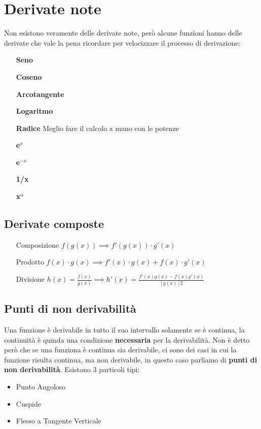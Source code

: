 \section{Derivate note}
Non esistono veramente delle derivate note, però alcune funzioni hanno delle derivate che vale la pena ricordare per velocizzare il processo di derivazione:
\begin{itemize}
	\item[\textbf{Seno}] 
	\item[\textbf{Coseno}] 
	\item[\textbf{Arcotangente}] 
	\item[\textbf{Logaritmo}] 
	\item[\textbf{Radice}] Meglio fare il calcolo a mano con le potenze%
	\item[\textbf{e$^x$}] 
	\item[\textbf{e$^{-x}$}] 
	\item[\textbf{1/x}] 
	\item[\textbf{x$^\alpha$}] 
\end{itemize}
\subsection*{Derivate composte}
\begin{itemize}
	\item[Composizione] $f(g(x)) \implies f'(g(x)) \cdot g'(x)$
	\item[Prodotto] $f(x) \cdot g(x) \implies f'(x) \cdot g(x) + f(x) \cdot g'(x)$
	\item[Divisione] $h(x)=\frac{f(x)}{g(x)} \implies h'(x) = \frac{f'(x)g(x) - f(x)g'(x)}{[g(x)]2}$
\end{itemize}
\subsection*{Punti di non derivabilità}
Una funzione è derivabile in tutto il suo intervallo solamente se è continua, la continuità è quinda una condizione
\textbf{necessaria} per la derivabilità. Non è detto però che se una funziona è continua sia derivabile,
ci sono dei casi in cui la funzione risulta continua, ma non derivabile, in questo caso parliamo di
\textbf{punti di non derivabilità}. Esistono 3 particoli tipi:
\begin{itemize}
	\item Punto Angoloso
	\item Cuspide
	\item Flesso a Tangente Verticale
\end{itemize}

